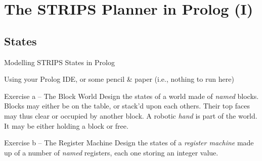 \documentclass[presentation]{beamer}\mode<presentation>{\usetheme{AMSBolognaFC}}
\begin{document}
\section{The STRIPS Planner in Prolog (I)}

\subsection{States}

\begin{frame}[allowframebreaks]{Modelling STRIPS States in Prolog}

Using your Prolog IDE, or some pencil \& paper (i.e., nothing to run here)

\startExercise

\begin{block}{Exercise \currentExercise{}a -- The Block World}
       Design the states of a world made of \emph{named} \alert{blocks}.
       Blocks may either be on the \alert{table}, or stack'd up\alert{on} each others.
       Their top faces may thus \alert{clear} or occupied by another block.
       A robotic \emph{hand} is part of the world.
       It may be either \alert{holding} a block or \alert{free}.
\end{block}

\begin{block}{Exercise \currentExercise{}b -- The Register Machine}
    Design the states of a \emph{register machine} made up of a number of \emph{named} \alert{registers}, each one storing an integer value.
\end{block}

\framebreak


\end{frame}
\end{document}
